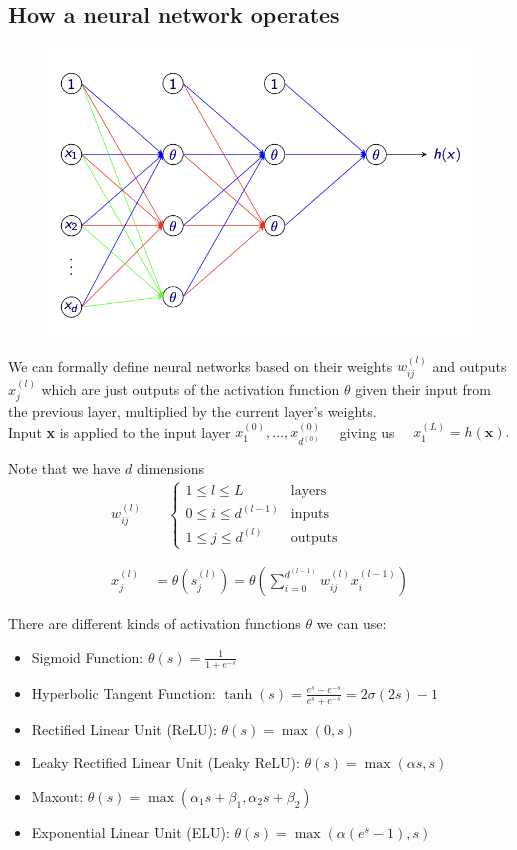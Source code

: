 \subsection{How a neural network operates}
\begin{figure}[H]
    \centering
    \includegraphics[width=0.5\linewidth]{img/nn.png}
    
    
\end{figure}

We can formally define neural networks based on their weights $w_{ij}^{(l)}$ and outputs $x^{(l)}_j$ which are just outputs of the activation function $\theta$ given their input from the previous layer, multiplied by the current layer's weights.\\

Input \textbf{x} is applied to the input layer $x_{1}^{(0)},\ldots,x_{d^{(0)}}^{(0)}\quad$ giving us $\quad x_{1}^{(L)}=h(\mathbf{x}).$

Note that we have $d$ dimensions
\[\begin{aligned}w_{ij}^{(l)}&\quad\begin{cases}1\le l\le L&\text{layers}\\0\le i\le d^{(l-1)}&\text{inputs}\\1\le j\le d^{(l)}&\text{outputs}\end{cases}\\\\\\x_j^{(l)}&=\theta(s_j^{(l)})=\theta\left(\sum_{i=0}^{d^{(l-1)}}w_{ij}^{(l)}x_i^{(l-1)}\right)\end{aligned}\]


There are different kinds of activation functions $\theta$ we can use:

\begin{itemize}
    \item Sigmoid Function: \(\theta(s) = \frac{1}{1 + e^{-s}}\)
    \item Hyperbolic Tangent Function: \(\tanh(s) = \frac{e^{s} - e^{-s}}{e^{s} + e^{-s}} = 2\sigma(2s) - 1\)
    \item Rectified Linear Unit (ReLU): \(\theta(s) = \max(0, s)\)
    \item Leaky Rectified Linear Unit (Leaky ReLU): \(\theta(s) = \max(\alpha s, s)\)
    \item Maxout: \(\theta(s) = \max(\alpha_1 s + \beta_1, \alpha_2 s + \beta_2)\)
    \item Exponential Linear Unit (ELU): \(\theta(s) = \max(\alpha(e^{s} - 1), s)\)
\end{itemize}

